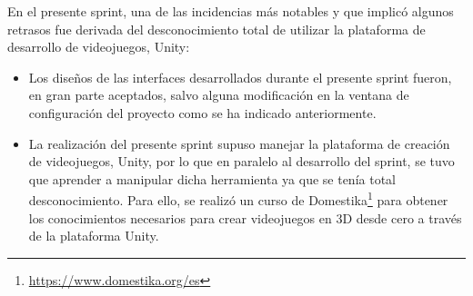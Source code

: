 En el presente sprint, una de las incidencias más notables y que implicó algunos retrasos fue derivada del desconocimiento total de utilizar la plataforma de desarrollo de videojuegos, Unity:
\begin{itemize}
	\item Los diseños de las interfaces desarrollados durante el presente sprint fueron, en gran parte aceptados, salvo alguna modificación en la ventana de configuración del proyecto como se ha indicado anteriormente.
	\item La realización del presente sprint supuso manejar la plataforma de creación de videojuegos, Unity, por lo que en paralelo al desarrollo del sprint, se tuvo que aprender a manipular dicha herramienta ya que se tenía total desconocimiento. Para ello, se realizó un curso de Domestika\footnote{\url{https://www.domestika.org/es}} para obtener los conocimientos necesarios para crear videojuegos en 3D desde cero a través de la plataforma Unity.
\end{itemize}